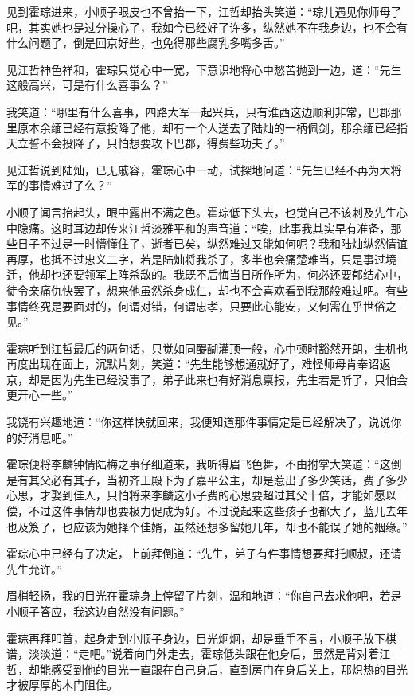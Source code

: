 见到霍琮进来，小顺子眼皮也不曾抬一下，江哲却抬头笑道：“琮儿遇见你师母了吧，其实她也是过分操心了，我如今已经好了许多，纵然她不在我身边，也不会有什么问题了，倒是回京好些，也免得那些腐乳多嘴多舌。”

见江哲神色祥和，霍琮只觉心中一宽，下意识地将心中愁苦抛到一边，道：“先生这般高兴，可是有什么喜事么？”

我笑道：“哪里有什么喜事，四路大军一起兴兵，只有淮西这边顺利非常，巴郡那里原本余缅已经有意投降了他，却有一个人送去了陆灿的一柄佩剑，那余缅已经指天立誓不会投降了，只怕想要攻下巴郡，得费些功夫了。”

见江哲说到陆灿，已无戚容，霍琮心中一动，试探地问道：“先生已经不再为大将军的事情难过了么？”

小顺子闻言抬起头，眼中露出不满之色。霍琮低下头去，也觉自己不该刺及先生心中隐痛。这时耳边却传来江哲淡雅平和的声音道：“唉，此事我其实早有准备，那些日子不过是一时懵懂住了，逝者已矣，纵然难过又能如何呢？我和陆灿纵然情谊再厚，也抵不过忠义二字，若是陆灿将我杀了，多半也会痛楚难当，只是事过境迁，他却也还要领军上阵杀敌的。我既不后悔当日所作所为，何必还要郁结心中，徒令亲痛仇快罢了，想来他虽然杀身成仁，却也不会喜欢看到我那般难过吧。有些事情终究是要面对的，何谓对错，何谓忠孝，只要此心能安，又何需在乎世俗之见。”

霍琮听到江哲最后的两句话，只觉如同醍醐灌顶一般，心中顿时豁然开朗，生机也再度出现在面上，沉默片刻，笑道：“先生能够想通就好了，难怪师母肯奉诏返京，却是因为先生已经没事了，弟子此来也有好消息禀报，先生若是听了，只怕会更开心一些。”

我饶有兴趣地道：“你这样快就回来，我便知道那件事情定是已经解决了，说说你的好消息吧。”

霍琮便将李麟钟情陆梅之事仔细道来，我听得眉飞色舞，不由拊掌大笑道：“这倒是有其父必有其子，当初齐王殿下为了嘉平公主，却是惹出了多少笑话，费了多少心思，才娶到佳人，只怕将来李麟这小子费的心思要超过其父十倍，才能如愿以偿，不过这件事情却也要极力促成为好。不过说起来这些孩子也都大了，蓝儿去年也及笈了，也应该为她择个佳婿，虽然还想多留她几年，却也不能误了她的姻缘。”

霍琮心中已经有了决定，上前拜倒道：“先生，弟子有件事情想要拜托顺叔，还请先生允许。”

眉梢轻扬，我的目光在霍琮身上停留了片刻，温和地道：“你自己去求他吧，若是小顺子答应，我这边自然没有问题。”

霍琮再拜叩首，起身走到小顺子身边，目光炯炯，却是垂手不言，小顺子放下棋谱，淡淡道：“走吧。”说着向门外走去，霍琮低头跟在他身后，虽然是背对着江哲，却能感受到他的目光一直跟在自己身后，直到房门在身后关上，那炽热的目光才被厚厚的木门阻住。

